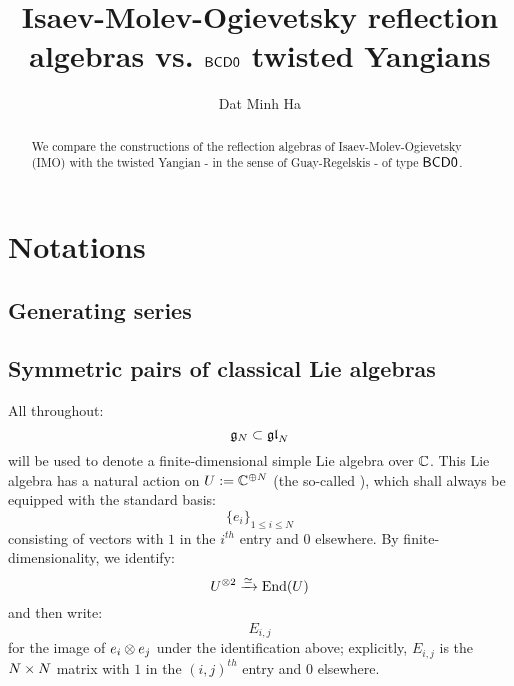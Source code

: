 

\setcounter{section}{-1}


\renewcommand{\simpleroots}{\mathbb{I}}
\newcommand{\romanzero}{\mathsf{0}}
\newcommand{\romanone}{\mathsf{I}}
\newcommand{\romantwo}{\mathsf{II}}
\newcommand{\romanthree}{\mathsf{III}}
\newcommand{\BCDzero}{\sfB\sfC\sfD\romanzero}
\newcommand{\XB}{\mathcal{XB}} %
\newcommand{\UXB}{\mathcal{UXB}} %
\newcommand{\UB}{\mathcal{UB}} %
\newcommand{\ZB}{\mathcal{ZB}} 



    \title{Isaev-Molev-Ogievetsky reflection algebras vs. $\BCDzero$ twisted Yangians}
    
    \author{Dat Minh Ha}
    \maketitle
    
    \begin{abstract}
        We compare the constructions of the reflection algebras of Isaev-Molev-Ogievetsky (IMO) with the twisted Yangian - in the sense of Guay-Regelskis - of type $\BCDzero$.
    \end{abstract}
    
    {
    \hypersetup{} 
    \tableofcontents %
    }

    \section{Notations}
        \subsection{Generating series}

        \subsection{Symmetric pairs of classical Lie algebras}
            All throughout:
                $$\mathfrak{g}_N \subset \mathfrak{gl}_N$$
            will be used to denote a finite-dimensional simple Lie algebra over $\mathbb{C}$. This Lie algebra has a natural action on $U := \mathbb{C}^{\oplus N}$ (the so-called ), which shall always be equipped with the standard basis:
                $$\{e_i\}_{1 \leq i \leq N}$$
            consisting of vectors with $1$ in the $i^{th}$ entry and $0$ elsewhere. By finite-dimensionality, we identify:
                $$U^{\tensor 2} \xrightarrow[]{\cong} \End(U)$$
            and then write:
                $$E_{i, j}$$
            for the image of $e_i \tensor e_j$ under the identification above; explicitly, $E_{i, j}$ is the $N \x N$ matrix with $1$ in the $(i, j)^{th}$ entry and $0$ elsewhere.

